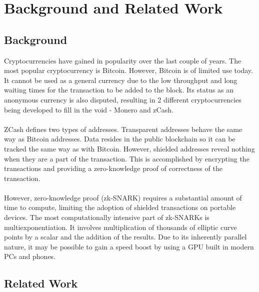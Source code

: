 
\chapter{Background and Related Work} %

\label{Chapter2} %


\section{Background}

Cryptocurrencies have gained in popularity over the last couple of years. The most popular cryptocurrency is Bitcoin. However, Bitcoin is of limited use today. It cannot be used as a general currency due to the low throughput and long waiting times for the transaction to be added to the block. Its status as an anonymous currency is also disputed, resulting in 2 different cryptocurrencies being developed to fill in the void - Monero\cite{monero} and zCash\cite{zcashprotocol}.\\
\\
ZCash defines two types of addresses. Transparent addresses behave the same way as Bitcoin addresses. Data resides in the public blockchain so it can be tracked the same way as with Bitcoin. However, shielded addresses reveal nothing when they are a part of the transaction. This is accomplished by encrypting the transactions and providing a zero-knowledge proof of correctness of the transaction\cite{zcashtechnology}.\\
\\
However, zero-knowledge proof (zk-SNARK\cite{zcashzksnarks}) requires a substantial amount of time to compute, limiting the adoption of shielded transactions on portable devices. The most computationally intensive part of zk-SNARKs is multiexponentiation. It involves multiplication of thousands of elliptic curve points by a scalar and the addition of the results. Due to its inherently parallel nature, it may be possible to gain a speed boost by using a GPU built in modern PCs and phones.



\section{Related Work}

